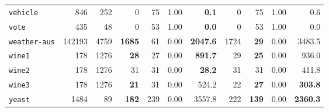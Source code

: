 \begin{tabular}{lccrrrrrrrr}
\texttt{vehicle} & \multicolumn{1}{r}{846} & \multicolumn{1}{r}{252}  & 0 & 75 & 1.00 & \textbf{0.1} & 0 & 75 & 1.00 & 0.6\\
\texttt{vote} & \multicolumn{1}{r}{435} & \multicolumn{1}{r}{48}  & 0 & 53 & 1.00 & \textbf{0.0} & 0 & 53 & 1.00 & 0.0\\
\texttt{weather-aus} & \multicolumn{1}{r}{142193} & \multicolumn{1}{r}{4759}  & \textbf{1685} & 61 & 0.00 & \textbf{2047.6} & 1724 & \textbf{29} & 0.00 & 3483.5\\
\texttt{wine1} & \multicolumn{1}{r}{178} & \multicolumn{1}{r}{1276}  & \textbf{28} & 27 & 0.00 & \textbf{891.7} & 29 & \textbf{25} & 0.00 & 936.0\\
\texttt{wine2} & \multicolumn{1}{r}{178} & \multicolumn{1}{r}{1276}  & 31 & 31 & 0.00 & \textbf{28.2} & 31 & 31 & 0.00 & 411.8\\
\texttt{wine3} & \multicolumn{1}{r}{178} & \multicolumn{1}{r}{1276}  & \textbf{21} & 31 & 0.00 & 524.2 & 22 & \textbf{27} & 0.00 & \textbf{303.8}\\
\texttt{yeast} & \multicolumn{1}{r}{1484} & \multicolumn{1}{r}{89}  & \textbf{182} & 239 & 0.00 & 3557.8 & 222 & \textbf{139} & 0.00 & \textbf{2360.3}\\
\bottomrule
\end{tabular}
